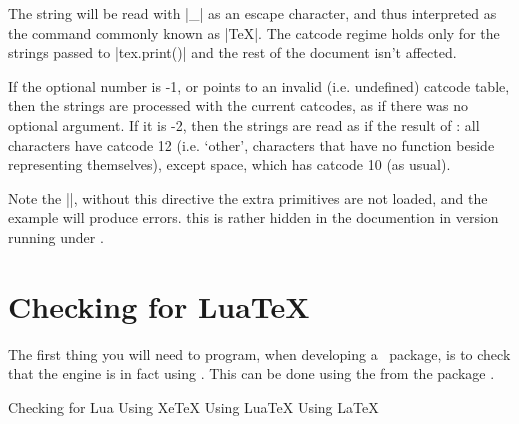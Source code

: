 The string will be read with |_| as an escape character, and thus interpreted as the command commonly known as |\TeX|. The catcode regime holds only for the strings passed to |tex.print()| and the rest of the document isn't affected.

If the optional number is -1, or points to an invalid (i.e. undefined) catcode table, then the strings are processed with the current catcodes, as if there was no optional argument. If it is -2, then the strings are read as if the result of \cmd{\detokenize}: all characters have catcode 12 (i.e. `other', characters that have no function beside representing themselves), except space, which has catcode 10 (as usual).


Note the ||, without this directive the extra primitives are not loaded, and the example will produce errors. this is rather hidden in the documention in version \the\luatexversion running under \formatname.


\section{Checking for LuaTeX}

The first thing you will need to program, when developing a \luatex\ package, is to check that the engine is in fact using \luatex. This can be done using the  from the package . 

\begin{texexample}{Checking for Lua}{}
\ifxetex
  Using XeTeX
\else
  \ifluatex
   Using LuaTeX
  \else
   Using LaTeX
  \fi
\fi
\end{texexample}


